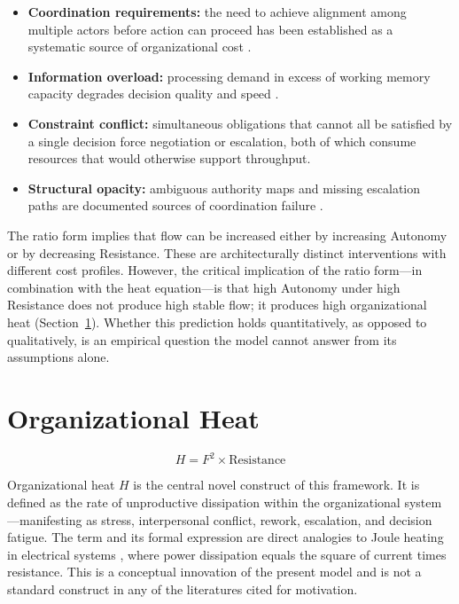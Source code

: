 \documentclass[12pt]{article}
\begin{document}
\begin{itemize}
  \item \textbf{Coordination requirements:} the need to achieve alignment
    among multiple actors before action can proceed has been established
    as a systematic source of organizational cost \citep{malone1994interdisciplinary}.
  \item \textbf{Information overload:} processing demand in excess of
    working memory capacity degrades decision quality and speed
    \citep{sweller1988cognitive}.
  \item \textbf{Constraint conflict:} simultaneous obligations that cannot
    all be satisfied by a single decision force negotiation or escalation,
    both of which consume resources that would otherwise support throughput.
  \item \textbf{Structural opacity:} ambiguous authority maps and missing
    escalation paths are documented sources of coordination failure
    \citep{mintzberg1979structuring}.
\end{itemize}

The ratio form implies that flow can be increased either by increasing
Autonomy or by decreasing Resistance. These are architecturally distinct
interventions with different cost profiles. However, the critical implication
of the ratio form---in combination with the heat equation---is that
high Autonomy under high Resistance does not produce high stable flow;
it produces high organizational heat (Section~\ref{sec:heat}).
Whether this prediction holds quantitatively, as opposed to qualitatively,
is an empirical question the model cannot answer from its assumptions alone.

\section{Organizational Heat}
\label{sec:heat}

\[
H = F^2 \times \text{Resistance}
\]

Organizational heat $H$ is the central novel construct of this framework.
It is defined as the rate of unproductive dissipation within the
organizational system---manifesting as stress, interpersonal conflict,
rework, escalation, and decision fatigue. The term and its formal expression
are direct analogies to Joule heating in electrical systems
\citep{feynman1963lectures}, where power dissipation equals the square
of current times resistance. This is a conceptual innovation of the present
model and is not a standard construct in any of the literatures cited for
motivation.
\end{document}
